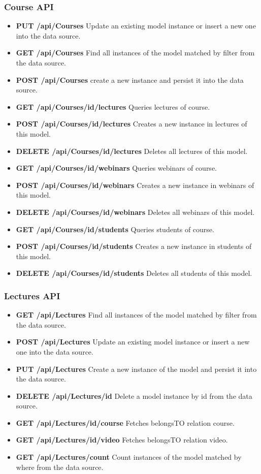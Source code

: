 \subsubsection{ Course API}
\begin{itemize}
\item \textbf{PUT /api/Courses} Update an existing model instance or insert a new one into the data source.
\item \textbf{GET /api/Courses} Find all instances of the model matched by filter from the data source.
\item \textbf{POST /api/Courses} create a new instance and persist it into the data source.
\item \textbf{GET /api/Courses/id/lectures} Queries lectures of course.
\item \textbf{POST /api/Courses/id/lectures} Creates a new instance in lectures of this model.
\item \textbf{DELETE /api/Courses/id/lectures} Deletes all lectures of this model.

\item \textbf{GET /api/Courses/id/webinars} Queries webinars of course.
\item \textbf{POST /api/Courses/id/webinars} Creates a new instance in webinars of this model.
\item \textbf{DELETE /api/Courses/id/webinars} Deletes all webinars of this model.

\item \textbf{GET /api/Courses/id/students} Queries students of course.
\item \textbf{POST /api/Courses/id/students} Creates a new instance in students of this model.
\item \textbf{DELETE /api/Courses/id/students} Deletes all students of this model.
\end{itemize}


\subsubsection{ Lectures API}
\begin{itemize}
\item \textbf{GET /api/Lectures} Find all instances of the model matched by filter from  the  data source.
\item \textbf{POST /api/Lectures} Update an existing model instance or insert a new one into the data  source.
\item \textbf{PUT /api/Lectures} Create a new instance of the model and persist it into the data   source.
\item \textbf{DELETE /api/Lectures/id} Delete a model instance by id from the data source.
\item \textbf{GET /api/Lectures/id/course} Fetches belongsTO relation course.

\item \textbf{GET /api/Lectures/id/video} Fetches belongsTO relation video.
\item \textbf{GET /api/Lectures/count} Count instances of the model matched by where from the data  source.
\end{itemize}

